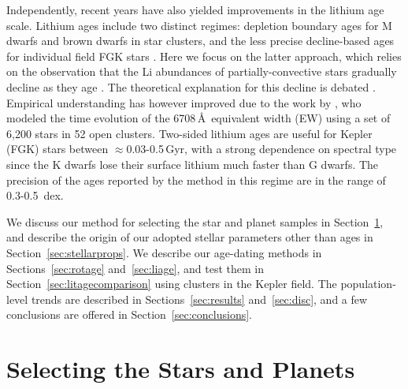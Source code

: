 \documentclass[11pt,twocolumn,tighten]{aastex63}
\begin{document}
Independently, recent years have also yielded improvements in the
lithium age scale.  Lithium ages include two distinct regimes:
depletion boundary ages for M dwarfs and brown dwarfs in star
clusters, and the less precise decline-based ages for individual field
FGK stars \citep{Soderblom_2010}.  Here we focus on the latter
approach, which relies on the observation that the Li abundances of
partially-convective stars gradually decline as they age
\citep[e.g.][]{2005A&A...442..615S}.  The theoretical explanation for
this decline is debated
\citep[e.g.][]{1995ApJ...441..865C,2010ApJ...716.1269D,2019MNRAS.485.4052C}.
Empirical understanding has however improved due to the work by
\citet{Jeffries_2023}, who modeled the time evolution of the
 6708\,\AA\ equivalent width (EW) using a set of 6{,}200
stars in 52 open clusters.  Two-sided lithium ages are useful for
Kepler (FGK) stars between $\approx$0.03-0.5\,Gyr, with a strong
dependence on spectral type since the K dwarfs lose their surface
lithium much faster than G dwarfs.  The precision of the ages reported
by the \citet{Jeffries_2023} method in this regime are in the range of
0.3-0.5~dex.

We discuss our method for selecting the star and planet samples in
Section~\ref{sec:selection}, and describe the origin of our adopted
stellar parameters other than ages in Section~\ref{sec:stellarprops}.
We describe our age-dating methods in
Sections~\ref{sec:rotage} and~\ref{sec:liage}, and test them in
Section~\ref{sec:litagecomparison} using
clusters in the Kepler field.  The population-level
trends are described in
Sections~\ref{sec:results} and~\ref{sec:disc}, and a few conclusions
are offered in Section~\ref{sec:conclusions}.


\section{Selecting the Stars and Planets}
\label{sec:selection}
\end{document}
